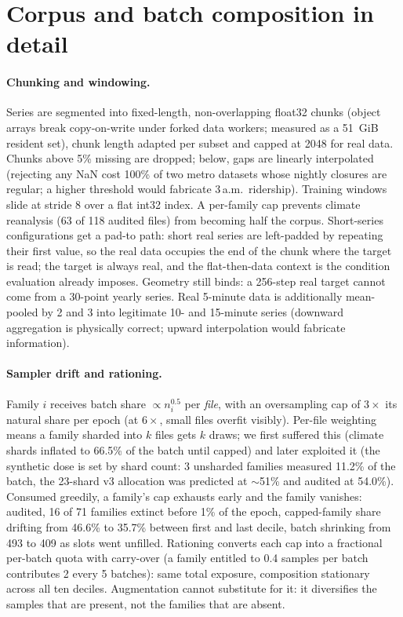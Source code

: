 \section{Corpus and batch composition in detail}
\label{app:corpus}

\paragraph{Chunking and windowing.}
Series are segmented into fixed-length, non-overlapping float32 chunks
(object arrays break copy-on-write under forked data workers; measured as
a 51~GiB resident set), chunk length adapted per subset and capped at
2048 for real data. Chunks above 5\% missing are dropped; below, gaps are
linearly interpolated (rejecting any NaN cost 100\% of two metro datasets
whose nightly closures are regular; a higher threshold would fabricate
3\,a.m.\ ridership). Training windows slide at stride 8 over a flat int32
index. A per-family cap prevents climate reanalysis (63 of 118 audited
files) from becoming half the corpus. Short-series configurations get a
pad-to path: short real series are left-padded by repeating their first
value, so the real data occupies the end of the chunk where the target is
read; the target is always real, and the flat-then-data context is the
condition evaluation already imposes. Geometry still binds: a 256-step
real target cannot come from a 30-point yearly series. Real 5-minute data
is additionally mean-pooled by 2 and 3 into legitimate 10- and 15-minute
series (downward aggregation is physically correct; upward interpolation
would fabricate information).

\paragraph{Sampler drift and rationing.}
Family $i$ receives batch share $\propto n_i^{0.5}$ per \emph{file}, with
an oversampling cap of $3\times$ its natural share per epoch (at
$6\times$, small files overfit visibly). Per-file weighting means a
family sharded into $k$ files gets $k$ draws; we first suffered this
(climate shards inflated to 66.5\% of the batch until capped) and later
exploited it (the synthetic dose is set by shard count: 3 unsharded
families measured 11.2\% of the batch, the 23-shard v3 allocation was
predicted at $\sim$51\% and audited at 54.0\%). Consumed greedily, a
family's cap exhausts early and the family vanishes: audited, 16 of 71
families extinct before 1\% of the epoch, capped-family share drifting
from 46.6\% to 35.7\% between first and last decile, batch shrinking from
493 to 409 as slots went unfilled. Rationing converts each cap into a
fractional per-batch quota with carry-over (a family entitled to 0.4
samples per batch contributes 2 every 5 batches): same total exposure,
composition stationary across all ten deciles. Augmentation cannot
substitute for it: it diversifies the samples that are present, not the
families that are absent.

